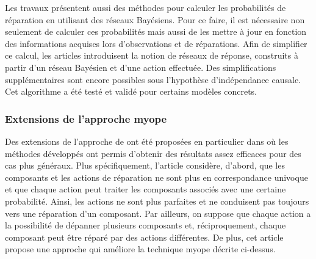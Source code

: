 \documentclass[a4paper,11pt]{article}
\theoremstyle{plain}
\theoremstyle{definition}
\begin{document}
Les travaux \cite{heckerman1994troubleshooting, Heckerman_1995} présentent aussi des méthodes pour calculer les probabilités de réparation en utilisant des réseaux Bayésiens. Pour ce faire, il est nécessaire non seulement de calculer ces probabilités mais aussi de les mettre à jour en fonction des informations acquises lors d'observations et de réparations. Afin de simplifier ce calcul, les articles introduisent la notion de réseaux de réponse, construits à partir d'un réseau Bayésien et d'une action effectuée. Des simplifications supplémentaires sont encore possibles sous l'hypothèse d'indépendance causale. Cet algorithme a été testé et validé pour certains modèles concrets.

%

\subsubsection{Extensions de l'approche myope}

Des extensions de l'approche de \cite{heckerman1994troubleshooting, Heckerman_1995} ont été proposées en particulier dans \cite{Jensen_2001, Langseth_2003} où les méthodes développés ont permis d'obtenir des résultats assez efficaces pour des cas plus généraux. Plus spécifiquement, l'article \cite{Jensen_2001} considère, d'abord, que les composants et les actions de réparation ne sont plus en correspondance univoque et que chaque action peut traiter les composants associés avec une certaine probabilité. Ainsi, les actions ne sont plus parfaites et ne conduisent pas toujours vers une réparation d'un composant. Par ailleurs, on suppose que chaque action a la possibilité de dépanner plusieurs composants et, réciproquement, chaque composant peut être réparé par des actions différentes. De plus, cet article propose une approche qui améliore la technique myope décrite ci-dessus. %
\end{document}
